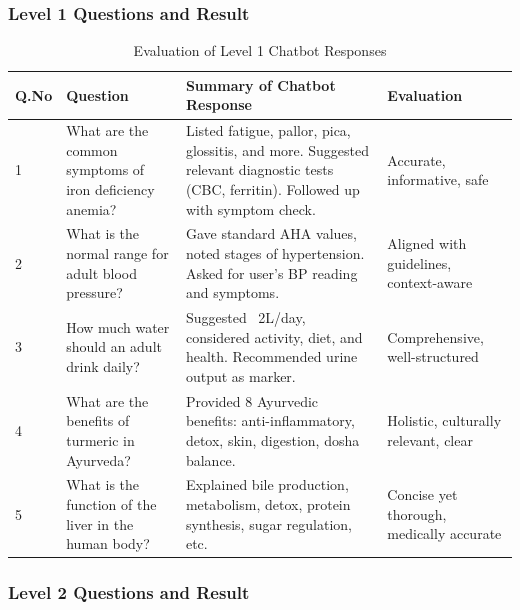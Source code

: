 \documentclass[12pt,a4paper]{report}
\begin{document}
\subsubsection{Level 1 Questions and Result}
\label{Level 1 Questions and Result}
\begin{table}[H]
\centering
\begin{tabular}{|p{1 cm}|p{4cm}|p{5cm}|p{3cm}|}
\hline
\textbf{Q.No} & \textbf{Question} & \textbf{Summary of Chatbot Response} & \textbf{Evaluation} \\ \hline
1 & What are the common symptoms of iron deficiency anemia? & Listed fatigue, pallor, pica, glossitis, and more. Suggested relevant diagnostic tests (CBC, ferritin). Followed up with symptom check. & Accurate, informative, safe \\ \hline
2 & What is the normal range for adult blood pressure? & Gave standard AHA values, noted stages of hypertension. Asked for user’s BP reading and symptoms. & Aligned with guidelines, context-aware \\ \hline
3 & How much water should an adult drink daily? & Suggested ~2L/day, considered activity, diet, and health. Recommended urine output as marker. & Comprehensive, well-structured \\ \hline
4 & What are the benefits of turmeric in Ayurveda? & Provided 8 Ayurvedic benefits: anti-inflammatory, detox, skin, digestion, dosha balance. & Holistic, culturally relevant, clear \\ \hline
5 & What is the function of the liver in the human body? & Explained bile production, metabolism, detox, protein synthesis, sugar regulation, etc. & Concise yet thorough, medically accurate \\ \hline
\end{tabular}
\caption{Evaluation of Level 1 Chatbot Responses}
\label{tab:chatbot_evaluation}
\end{table}



\subsubsection{Level 2 Questions and Result}
\label{Level 2 Questions and Result}
\end{document}
